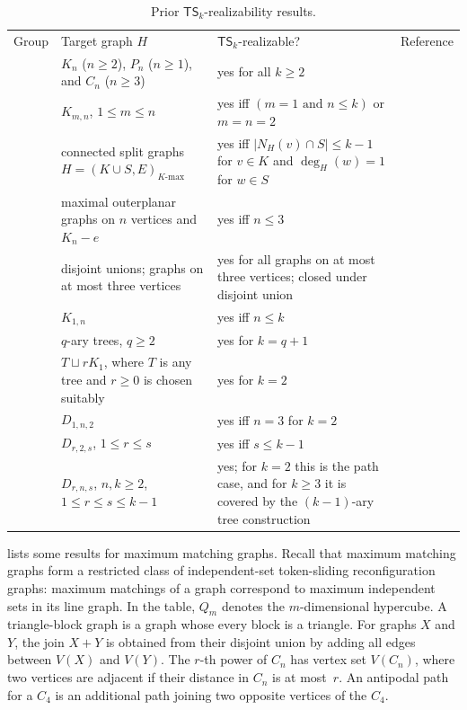 \documentclass[a4paper]{article}
\theoremstyle{plain}
\theoremstyle{definition}
\newcommand{\TSsym}{\mathsf{TS}}
\numberwithin{equation}{section}
\newcommand{\TableGroupRule}{\specialrule{1.1pt}{0.45ex}{0.45ex}}
\begin{document}
\begin{table}[htbp]
\centering
\renewcommand{\arraystretch}{1.18}
\begin{tabularx}{\textwidth}{@{}L{0.20\textwidth}YYL{0.11\textwidth}@{}}
\toprule
Group & Target graph $H$ & $\TSsym_k$-realizable? & Reference \\
\TableGroupRule
{}
& $K_n$ ($n\ge 2$), $P_n$ ($n\ge 1$), and $C_n$ ($n\ge 3$) & yes for all $k\ge 2$ & \cite{AvisHoang2023} \\
\cmidrule(lr){2-4}
& $K_{m,n}$, $1\le m\le n$ & yes iff $(m=1\text{ and }n\le k)$ or $m=n=2$ & \cite{AvisHoang2023} \\
\cmidrule(lr){2-4}
& connected split graphs $H=(K\cup S,E)_{\text{$K$-max}}$ & yes iff $|N_H(v)\cap S|\le k-1$ for $v\in K$ and $\deg_H(w)=1$ for $w\in S$ & \cite{AvisHoang2023} \\
\cmidrule(lr){2-4}
& maximal outerplanar graphs on $n$ vertices and $K_n-e$ & yes iff $n\le 3$ & \cite{AvisHoang2023} \\
\cmidrule(lr){2-4}
& disjoint unions; graphs on at most three vertices & yes for all graphs on at most three vertices; closed under disjoint union & \cite{AvisHoang2023} \\
\TableGroupRule
{}
& $K_{1,n}$ & yes iff $n\le k$ & \cite{AvisHoang2023,AvisHoang2024} \\
\cmidrule(lr){2-4}
& $q$-ary trees, $q\ge 2$ & yes for $k=q+1$ & \cite{AvisHoang2024} \\
\cmidrule(lr){2-4}
& $T\sqcup rK_1$, where $T$ is any tree and $r\ge 0$ is chosen suitably & yes for $k=2$ & \cite{AvisHoang2024} \\
\cmidrule(lr){2-4}
& $D_{1,n,2}$ & yes iff $n=3$ for $k=2$ & \cite{AvisHoang2024} \\
\cmidrule(lr){2-4}
& $D_{r,2,s}$, $1\le r\le s$ & yes iff $s\le k-1$ & \cite{AvisHoang2024} \\
\cmidrule(lr){2-4}
& $D_{r,n,s}$, $n,k\ge 2$, $1\le r\le s\le k-1$ & yes; for $k=2$ this is the path case, and for $k\ge 3$ it is covered by the $(k-1)$-ary tree construction & \cite{AvisHoang2024} \\
\bottomrule
\end{tabularx}
\caption{Prior $\TSsym_k$-realizability results.}
\label{tab:known-realizability}
\end{table}

 lists some results for maximum matching graphs.
Recall that maximum matching graphs form a restricted class of independent-set token-sliding reconfiguration graphs: maximum matchings of a graph correspond to maximum independent sets in its line graph.
In the table, $Q_m$ denotes the $m$-dimensional hypercube.
A triangle-block graph is a graph whose every block is a triangle.
For graphs $X$ and $Y$, the join $X+Y$ is obtained from their disjoint union by adding all edges between $V(X)$ and $V(Y)$.
The $r$-th power of $C_n$ has vertex set $V(C_n)$, where two vertices are adjacent if their distance in $C_n$ is at most~$r$.
An antipodal path for a $C_4$ is an additional path joining two opposite vertices of the $C_4$.
\end{document}

